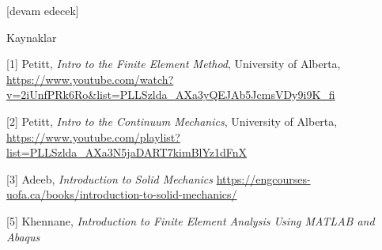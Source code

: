 \documentclass[12pt,fleqn]{article}\usepackage{../../common}
\begin{document}
[devam edecek]

Kaynaklar

[1] Petitt, {\em Intro to the Finite Element Method}, University of Alberta,
    \url{https://www.youtube.com/watch?v=2iUnfPRk6Ro&list=PLLSzlda_AXa3yQEJAb5JcmsVDy9i9K_fi}

[2] Petitt, {\em Intro to the Continuum Mechanics}, University of Alberta,
    \url{https://www.youtube.com/playlist?list=PLLSzlda_AXa3N5jaDART7kimBlYz1dFnX}

[3] Adeeb, {\em Introduction to Solid Mechanics}
    \url{https://engcourses-uofa.ca/books/introduction-to-solid-mechanics/}
    
[5] Khennane, {\em Introduction to Finite Element Analysis Using MATLAB and Abaqus}
\end{document}
